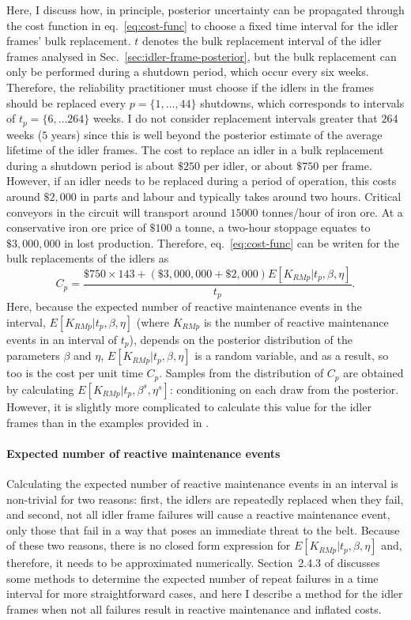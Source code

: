 Here, I discuss how, in principle, posterior uncertainty can be propagated through the cost function in eq.~\eqref{eq:cost-func} to choose a fixed time interval for the idler frames' bulk replacement. $t$ denotes the bulk replacement interval of the idler frames analysed in Sec.~\ref{sec:idler-frame-posterior}, but the bulk replacement can only be performed during a shutdown period, which occur every six weeks. Therefore, the reliability practitioner must choose if the idlers in the frames should be replaced every $p = \{1,\dots, 44\}$ shutdowns, which corresponds to intervals of $t_p = \{6, \dots 264\}$ weeks. I do not consider replacement intervals greater that $264$ weeks ($5$ years) since this is well beyond the posterior estimate of the average lifetime of the idler frames. The cost to replace an idler in a bulk replacement during a shutdown period is about $\$250$ per idler, or about $\$750$ per frame. However, if an idler needs to be replaced during a period of operation, this costs around $\$2,000$ in parts and labour and typically takes around two hours. Critical conveyors in the circuit will transport around $15000$ tonnes/hour of iron ore. At a conservative iron ore price of $\$100$ a tonne, a two-hour stoppage equates to $\$3,000,000$ in lost production. Therefore, eq.~\eqref{eq:cost-func} can be writen for the bulk replacements of the idlers as
\begin{equation}
  \label{eq:cost-func-idlers}
 C_p = \frac{\$750 \times 143 + (\$3,000,000 + \$2,000) E[K_{RM p}|t_p,\beta,\eta]}{t_p}.
\end{equation}
Here, because the expected number of reactive maintenance events in the interval, $E[K_{RM p}|t_p,\beta,\eta]$ (where $K_{RM p}$ is the number of reactive maintenance events in an interval of $t_p$), depends on the posterior distribution of the parameters $\beta$ and $\eta$, $E[K_{RM p}|t_p,\beta,\eta]$ is a random variable, and as a result, so too is the cost per unit time $C_p$. Samples from the distribution of $C_p$ are obtained by calculating $E[K_{RM p}|t_p,\beta^s,\eta^s]$: conditioning on each draw from the posterior. However, it is slightly more complicated to calculate this value for the idler frames than in the examples provided in \citet{jardine2013}.

\paragraph*{Expected number of reactive maintenance events}

Calculating the expected number of reactive maintenance events in an interval is non-trivial for two reasons: first, the idlers are repeatedly replaced when they fail, and second, not all idler frame failures will cause a reactive maintenance event, only those that fail in a way that poses an immediate threat to the belt. Because of these two reasons, there is no closed form expression for $E[K_{RM p}|t_p,\beta,\eta]$ and, therefore, it needs to be approximated numerically. Section~2.4.3 of \citet{jardine2013} discusses some methods to determine the expected number of repeat failures in a time interval for more straightforward cases, and here I describe a method for the idler frames when not all failures result in reactive maintenance and inflated costs.

